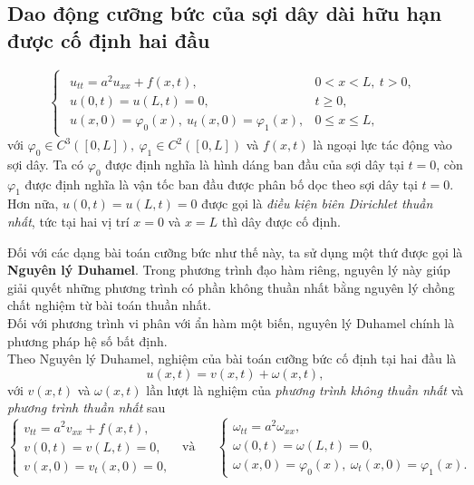 \documentclass[10pt, a4paper]{article}
\begin{document}
	\subsection{Dao động cưỡng bức của sợi dây dài hữu hạn được cố định hai đầu}
	\vspace{1mm}
	\begin{tcolorbox}[enhanced,colback=blue!5!white,colframe=blue!75!black,sharp corners=all,shadow={0mm}{0mm}{-1.5mm}%
		{fill=blue!75!red,opacity=0.3},title=\textbf{Dạng của bài toán}]
		$$\begin{cases}
			\begin{array}{ll}
				u_{tt}=a^2u_{xx}+f(x,t), & 0<x<L,~t>0,\\
				u(0,t)=u(L,t)=0, & t\ge0,\\
				u(x,0)=\varphi_0(x),~u_t(x,0)=\varphi_1(x), & 0\le x\le L,
			\end{array}
		\end{cases}$$
		với $\varphi_0\in C^3([0,L]),~\varphi_1\in C^2([0,L])$ và $f(x,t)$ là ngoại lực tác động vào sợi dây.\vskip7pt
		\quad Ta có $\varphi_0$ được định nghĩa là hình dáng ban đầu của sợi dây tại $t=0$, còn $\varphi_1$ được định nghĩa là vận tốc ban đầu được phân bố dọc theo sợi dây tại $t=0$.\vskip7pt
		\quad Hơn nữa, $u(0,t)=u(L,t)=0$ được gọi là \textit{điều kiện biên Dirichlet thuần nhất}, tức tại hai vị trí $x=0$ và $x=L$ thì dây được cố định.
	\end{tcolorbox}
	\vspace{2mm}
	
	Đối với các dạng bài toán cưỡng bức như thế này, ta sử dụng một thứ được gọi là \textbf{Nguyên lý Duhamel}. Trong phương trình đạo hàm riêng, nguyên lý này giúp giải quyết những phương trình có phần không thuần nhất bằng nguyên lý chồng chất nghiệm từ bài toán thuần nhất.\\
	
	Đối với phương trình vi phân với ẩn hàm một biến, nguyên lý Duhamel chính là phương pháp hệ số bất định.\\
	
	Theo Nguyên lý Duhamel, nghiệm của bài toán cưỡng bức cố định tại hai đầu là $$u(x,t)=v(x,t)+\omega(x,t),$$
	với $v(x,t)$ và $\omega(x,t)$ lần lượt là nghiệm của \textit{phương trình không thuần nhất} và \textit{phương trình thuần nhất} sau $$\begin{cases}
		v_{tt}=a^2v_{xx}+f(x,t),\\
		v(0,t)=v(L,t)=0,\\
		v(x,0)=v_t(x,0)=0,
	\end{cases}\text{~~và~~~~~}\begin{cases}
		\omega_{tt}=a^2\omega_{xx},\\
		\omega(0,t)=\omega(L,t)=0,\\
		\omega(x,0)=\varphi_0(x),~\omega_t(x,0)=\varphi_1(x).
	\end{cases}$$
	
\end{document}
